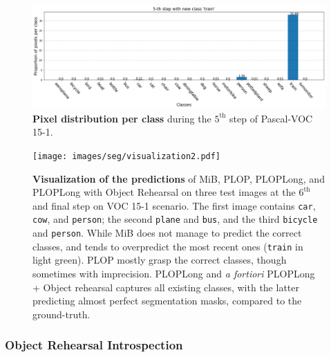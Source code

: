 


\begin{figure}
    \centering
    \includegraphics[width=\linewidth]{images/seg/distribution_5step_voc.png}
    \vspace*{-0.3cm}
    \caption{\textbf{Pixel distribution per class} during the $5^{\text{th}}$ step of Pascal-VOC
        15-1.}
    \label{fig:seg_distribution_voc_5th}
\end{figure}

\begin{figure}
    \centering
    \texttt{[image: images/seg/visualization2.pdf]}
    \caption{\textbf{Visualization of the predictions} of MiB, PLOP, PLOPLong, and PLOPLong with Object
        Rehearsal on three test images at the $6^\text{th}$ and final step on VOC 15-1 scenario. The
        first image contains \texttt{car}, \texttt{cow}, and \texttt{person}; the second
        \texttt{plane} and \texttt{bus}, and the third \texttt{bicycle} and \texttt{person}. While
        MiB does not manage to predict the correct classes, and tends to overpredict the most recent
        ones (\eg \texttt{train} in light green). PLOP mostly grasp the correct classes, though
        sometimes with imprecision. PLOPLong and \textit{a fortiori} PLOPLong + Object rehearsal
        captures all existing classes, with the latter predicting almost perfect segmentation masks,
        compared to the ground-truth.}
    \label{fig:seg_visualization}
\end{figure}

\subsubsection{Object Rehearsal Introspection}

